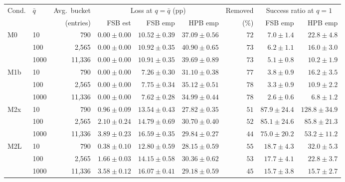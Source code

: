 \begin{tabular}{llrrrrrrr}
\toprule
Cond. & $\bar q$ & Avg.\ bucket & \multicolumn{3}{c}{Loss at $q=\bar q$ (pp)} & Removed & \multicolumn{2}{c}{Success ratio at $q=1$} \\
\cmidrule(lr){4-6}\cmidrule(lr){8-9}
 & & (entries) & FSB est & FSB emp & HPB emp & (\%) & FSB emp & HPB emp \\
\midrule
M0 & 10 & 790 & $0.00 \pm 0.00$ & $10.52 \pm 0.39$ & $37.09 \pm 0.56$ & $72$ & $7.0 \pm 1.4$ & $22.8 \pm 4.8$ \\
 & 100 & 2,565 & $0.00 \pm 0.00$ & $10.92 \pm 0.35$ & $40.90 \pm 0.65$ & $73$ & $6.2 \pm 1.1$ & $16.0 \pm 3.0$ \\
 & 1000 & 11,336 & $0.00 \pm 0.00$ & $10.91 \pm 0.35$ & $39.69 \pm 0.89$ & $73$ & $5.1 \pm 0.8$ & $10.2 \pm 1.9$ \\
\midrule
M1b & 10 & 790 & $0.00 \pm 0.00$ & $7.26 \pm 0.30$ & $31.10 \pm 0.38$ & $77$ & $3.8 \pm 0.9$ & $16.2 \pm 3.5$ \\
 & 100 & 2,565 & $0.00 \pm 0.00$ & $7.75 \pm 0.34$ & $35.12 \pm 0.51$ & $78$ & $3.3 \pm 0.9$ & $10.9 \pm 2.2$ \\
 & 1000 & 11,336 & $0.00 \pm 0.00$ & $7.62 \pm 0.28$ & $34.99 \pm 0.44$ & $78$ & $2.6 \pm 0.6$ & $6.8 \pm 1.2$ \\
\midrule
M2x & 10 & 790 & $0.96 \pm 0.09$ & $13.54 \pm 0.43$ & $27.82 \pm 0.35$ & $51$ & $87.9 \pm 24.4$ & $128.8 \pm 34.9$ \\
 & 100 & 2,565 & $2.10 \pm 0.24$ & $14.79 \pm 0.69$ & $30.70 \pm 0.40$ & $52$ & $85.1 \pm 24.6$ & $85.8 \pm 21.3$ \\
 & 1000 & 11,336 & $3.89 \pm 0.23$ & $16.59 \pm 0.35$ & $29.84 \pm 0.27$ & $44$ & $75.0 \pm 20.2$ & $53.2 \pm 11.2$ \\
\midrule
M2L & 10 & 790 & $0.38 \pm 0.10$ & $12.80 \pm 0.59$ & $28.15 \pm 0.59$ & $55$ & $18.7 \pm 4.3$ & $32.0 \pm 5.3$ \\
 & 100 & 2,565 & $1.66 \pm 0.03$ & $14.15 \pm 0.58$ & $30.36 \pm 0.62$ & $53$ & $17.7 \pm 4.1$ & $22.8 \pm 3.7$ \\
 & 1000 & 11,336 & $3.58 \pm 0.12$ & $16.07 \pm 0.41$ & $29.18 \pm 0.59$ & $45$ & $15.7 \pm 3.8$ & $15.7 \pm 2.7$ \\
\bottomrule
\end{tabular}
